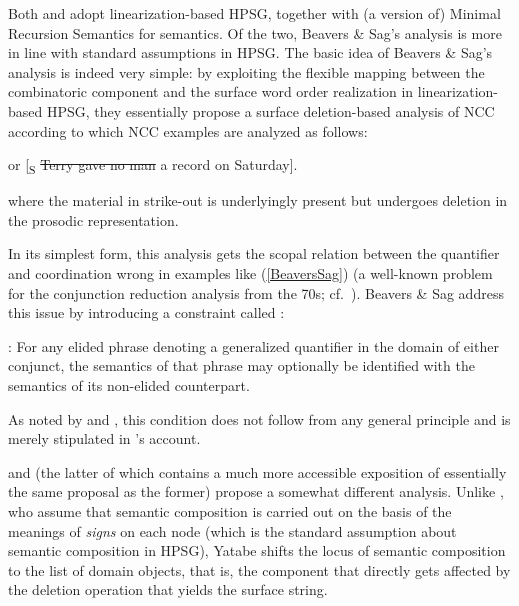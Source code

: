 \documentclass[output=paper,biblatex,babelshorthands,newtxmath,draftmode,colorlinks,citecolor=brown]{langscibook}
\begin{document}
Both \citet{BS2004a} and \citet{Yatabe2001a} adopt linearization-based HPSG, together
with (a version of) Minimal Recursion Semantics for
semantics. Of the two, Beavers \& Sag's
analysis is more in line with standard assumptions in HPSG. The basic
idea of Beavers \& Sag's analysis is indeed very simple: by exploiting the flexible
mapping between the combinatoric component and the surface word order
realization in linearization-based HPSG, they essentially propose a
surface deletion-based analysis of NCC according to which NCC examples
are analyzed as follows:
%
\begin{exe}
 \ex\label{BeaversSag} or
  [\textsubscript{S} \sout{Terry gave no man} a record on Saturday]. 
\end{exe}
where the material in strike-out is underlyingly present but undergoes
deletion in the prosodic representation.

In its simplest form, this analysis gets the scopal relation between
the quantifier and coordination wrong in examples like (\ref{BeaversSag}) (a
well-known problem for the conjunction reduction analysis from the
70s; cf.\ \citealt{partee70}).
Beavers \& Sag address this issue by introducing a constraint called
:
%
\begin{exe}
 \ex\label{OQM}
  : For any elided phrase 
  denoting a generalized quantifier in the 
  domain of either conjunct, the semantics of that phrase may
  optionally be identified with the semantics of its non-elided
  counterpart.
\end{exe}
As noted by \citet{levine11}
and \citet[Section~3.2.1]{kubota-levine-coord}, this condition
does not follow from any general principle and is merely stipulated in
\citeauthor{BS2004a}'s account.

\citet{Yatabe2001a} and \citet{yatabe-tam2017} (the latter of which contains a
much more accessible exposition of essentially the same proposal as
the former) propose a somewhat different analysis. Unlike \citeauthor{BS2004a}, who
assume that semantic composition is carried out on the basis of the
meanings of \emph{signs} on each node (which is the standard assumption
about semantic composition in HPSG), Yatabe shifts the locus of
semantic composition to the list of domain objects, that is, the
component that directly gets affected by the deletion operation that
yields the surface string.
\pagebreak
\end{document}
